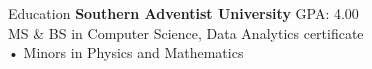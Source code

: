 \begin{rSection}{Education}
  {\bf Southern Adventist University} \hfill GPA: {4.00}\\
  MS \& BS in Computer Science, Data Analytics certificate \hfill {}\\
  {• Minors in Physics and Mathematics}
\end{rSection}
